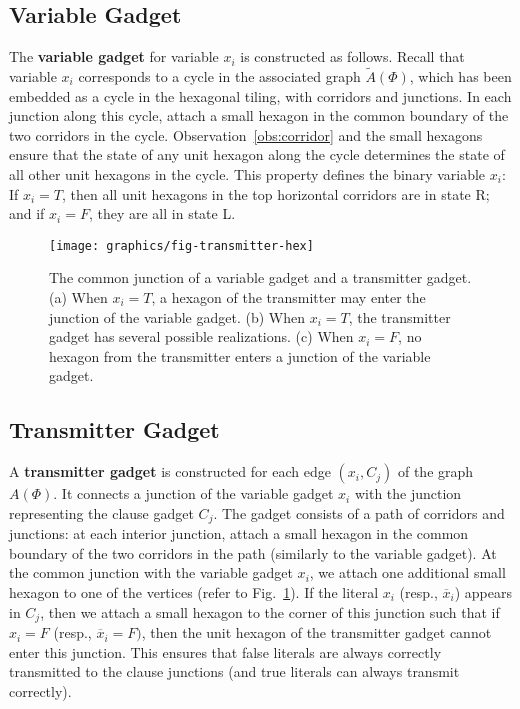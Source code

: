 \subsection{Variable Gadget}
The {\bf variable gadget} for variable $x_i$ is constructed as follows. Recall that variable $x_i$ corresponds to a cycle in the associated graph $\tilde{A}(\Phi)$, which has been embedded as a cycle in the hexagonal tiling, with corridors and junctions. In each junction along this cycle, attach a small hexagon in the common boundary of the two corridors in the cycle. Observation~\ref{obs:corridor} and the small hexagons ensure that the state of any unit hexagon along the cycle determines the state of all other unit hexagons in the cycle. This property defines the binary variable $x_i$: If $x_i=T$, then all unit hexagons in the top horizontal corridors are in state R; and if $x_i=F$, they are all in state L.
\begin{figure}[htbp]
	\centering
	\texttt{[image: graphics/fig-transmitter-hex]}
	\caption{The common junction of a variable gadget and a transmitter gadget.
(a) When $x_i=T$, a hexagon of the transmitter may enter the junction of the variable gadget.
(b) When $x_i=T$, the transmitter gadget has several possible realizations.
(c) When $x_i=F$, no hexagon from the transmitter enters a junction of the variable gadget.}
	\label{fig:transmitter}
\end{figure}
\subsection{Transmitter Gadget}
A {\bf transmitter gadget} is constructed for each edge $(x_i,C_j)$ of the graph $A(\Phi)$.
It connects a junction of the variable gadget $x_i$ with the junction representing the clause gadget $C_j$. The gadget consists of a path of corridors and junctions: at each interior junction, attach a small hexagon in the common boundary of the two corridors in the path (similarly to the variable gadget). At the common junction with the variable gadget $x_i$, we attach one additional small hexagon to one of the vertices (refer to Fig.~\ref{fig:transmitter}). If the literal $x_i$ (resp., $\overline{x}_i$) appears in $C_j$, then we attach a small hexagon to the corner of this junction such that if $x_i=F$ (resp., $\overline{x}_i=F)$, then the unit hexagon of the transmitter gadget cannot enter this junction. This ensures that false literals are always correctly transmitted to the clause junctions (and true literals can always transmit correctly).
